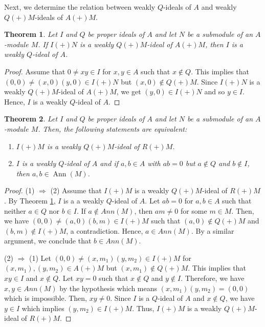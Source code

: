 \documentclass[preprint,review,10pt]{amsart}
\newtheorem{theorem}{Theorem}[section]
\theoremstyle{definition}
\newtheorem{example}[theorem]{Example}
\theoremstyle{remark}
\numberwithin{equation}{section}
\begin{document}
 Next, we determine the relation between weakly $Q$-ideals of $A$ and weakly $Q(+)M$-ideals of $A(+)M$. 
 \begin{theorem} \label{9}
 Let $I$ and $Q$ be proper  ideals of $A$ and let $N$ be a submodule of an $A$-module $M$. If $I(+)N$ is a weakly $Q(+)M$-ideal of  $A(+)M$, then $I$ is a weakly $Q$-ideal of $A$. 
 \end{theorem}
 \begin{proof}
 Assume that $0 \neq xy \in I$ for $x,y \in A$ such that $x \notin Q$. This implies that $(0,0) \neq (x,0)(y,0) \in I(+) N$ but $(x,0) \notin Q(+)M$. Since $I(+)N$ is a weakly $Q(+)M$-ideal of  $A(+)M$, we get $(y,0) \in I(+)N$ and so $y \in I$. Hence, $I$ is a weakly $Q$-ideal of $A$.
 \end{proof}
  \begin{theorem} \label{10}
 Let $I$ and $Q$ be proper  ideals of $A$ and let $N$ be a submodule of an $A$-module $M$. Then, the following statements are equivalent:
\begin{enumerate}
\item $I(+)M$ is a weakly $Q(+)M$-ideal of $R(+)M$.
\item   $I$ is a weakly $Q$-ideal of $A$ and if $a, b \in A$ with $ab = 0$ but $a \notin Q$ and $b \notin I$, then $a, b \in \operatorname{Ann}(M)$.
 \end{enumerate}
 \end{theorem}
 \begin{proof}
 (1) $\Longrightarrow$ (2) Assume that $I(+)M$ is a weakly $Q(+)M$-ideal of $R(+)M$. By Theorem \ref{9}, $I$ is a a weakly $Q$-ideal of $A$. Let $ab=0$ for $a,b \in A$ such that neither $a \in Q$ nor $b \in I$. If $a \notin Ann(M)$, then $am \neq 0$ for some $m \in M$. Then, we have $(0,0) \neq (a,0)(b,m) \in I (+) M$ such that $(a,0) \notin Q(+)M$ and $(b,m) \notin I(+)M$, a contradiction. Hence, $a \in Ann(M)$. By a similar argument, we conclude that $b \in Ann(M)$.
 
  (2) $\Longrightarrow$ (1) Let $(0,0) \neq (x,m_1)(y,m_2) \in I(+)M$ for $ (x,m_1),(y,m_2) \in  A(+)M$ but $(x,m_1) \notin Q(+)M$. This implies that $  xy \in I$ and $x \notin Q$. Let $xy=0$ such that $x \notin Q$ and $y \notin I$. Therefore, we have $x,y \in Ann(M)$ by the hypothesis which means $(x,m_1)(y,m_2)=(0,0)$ which is impossible. Then, $xy \neq 0$. Since $I$ is a $Q$-ideal of $A$ and $x \notin Q$, we have $y \in I$ which implies $(y,m_2) \in I(+)M$. Thus, $I(+)M$ is a weakly $Q(+)M$-ideal of $R(+)M$.
 \end{proof}
\end{document}
